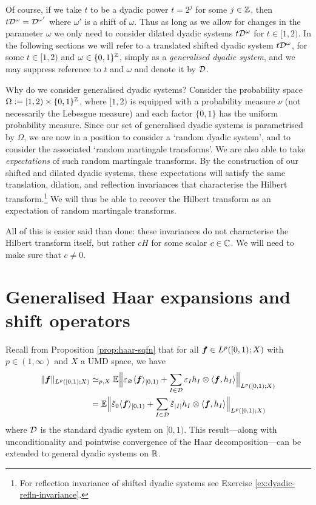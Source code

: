 Of course, if we take $t$ to be a dyadic power $t = 2^{j}$ for some $j \in \mathbb{Z}$, then $t\mathcal{D}^{\omega} = \mathcal{D}^{\omega'}$ where $\omega'$ is a shift of $\omega$.
Thus as long as we allow for changes in the parameter $\omega$ we only need to consider dilated dyadic systems $t\mathcal{D}^{\omega}$ for $t \in [1,2)$.
In the following sections we will refer to a translated shifted dyadic system $t\mathcal{D}^{\omega}$, for some $t \in [1,2)$ and $\omega \in \{0,1\}^{\mathbb{Z}}$, simply as a \emph{generalised dyadic system}, and we may suppress reference to $t$ and $\omega$ and denote it by $\mathcal{D}$.

Why do we consider generalised dyadic systems?
Consider the probability space $\Omega := [1,2) \times \{0,1\}^{\mathbb{Z}}$, where $[1,2)$ is equipped with a probability measure $\nu$ (not necessarily the Lebesgue measure) and each factor $\{0,1\}$ has the uniform probability measure.
Since our set of generalised dyadic systems is parametrised by $\Omega$, we are now in a position to consider a `random dyadic system', and to consider the associated `random martingale transforms'.
We are also able to take \emph{expectations} of such random martingale transforms.
By the construction of our shifted and dilated dyadic systems, these expectations will satisfy the same translation, dilation, and reflection invariances that characterise the Hilbert transform.\footnote{For reflection invariance of shifted dyadic systems see Exercise \ref{ex:dyadic-refln-invariance}.}
We will thus be able to recover the Hilbert transform as an expectation of random martingale transforms.

All of this is easier said than done: these invariances do not characterise the Hilbert transform itself, but rather $cH$ for some scalar $c \in \mathbb{C}$.
We will need to make sure that $c \neq 0$.

\section{Generalised Haar expansions and shift operators}

Recall from Proposition \ref{prop:haar-sqfn} that for all $\bm{f} \in L^p([0,1);X)$ with $p \in (1,\infty)$ and $X$ a UMD space, we have 
  \begin{equation*}
    \begin{aligned}
    \|\bm{f}\|_{L^p([0,1);X)}
    &\simeq_{p,X} \mathbb{E} \Big\| \varepsilon_{\varnothing} \langle \bm{f} \rangle_{[0,1)} +  \sum_{I \in \mathcal{D}} \varepsilon_{I} h_{I} \otimes \langle \bm{f}, h_{I} \rangle \Big\|_{L^p([0,1);X)} \\
    &= \mathbb{E} \Big\| \tilde{\varepsilon}_{0} \langle \bm{f} \rangle_{[0,1)} + \sum_{I \in \mathcal{D}} \tilde{\varepsilon}_{|I|} h_{I} \otimes \langle \bm{f}, h_{I} \rangle \Big\|_{L^p([0,1);X)}
  \end{aligned}
\end{equation*}
where $\mathcal{D}$ is the standard dyadic system on $[0,1)$.
This result---along with unconditionality and pointwise convergence of the Haar decomposition---can be extended to general dyadic systems on $\mathbb{R}$.

